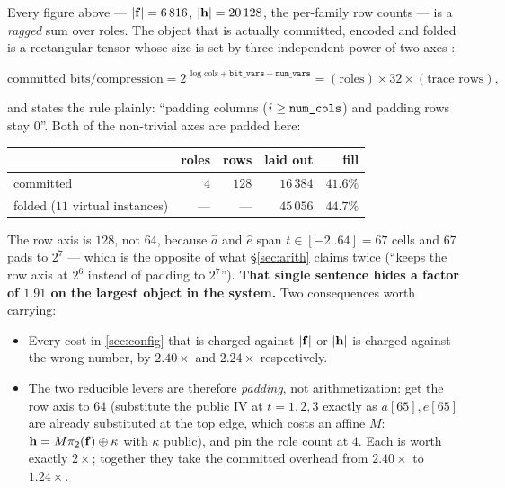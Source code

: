 \begin{warning}\label{warn:laidout}
Every figure above --- $|\mathbf{f}|=6\,816$, $|\mathbf{h}|=20\,128$, the per-family row
counts --- is a \emph{ragged} sum over roles. The object that is actually
committed, encoded and folded is a rectangular tensor whose size is set by three
independent power-of-two axes :
\begin{center}
\small
\(
  \text{committed bits/compression}
  =
  2^{\,\log\mathrm{cols}+\mathtt{bit\_vars}+\mathtt{num\_vars}}
  =
  (\text{roles})\times32\times(\text{trace rows}),
\)
\end{center}
and  states the rule plainly: ``padding columns
($i\geq\code{num\_cols}$) and padding rows stay $0$''. Both of the non-trivial
axes are padded here:

\begin{center}\small
\begin{tabular}{@{}lrrrr@{}}
\toprule
& roles & rows & laid out & fill\\
\midrule
committed & $4$ & $128$ & $16\,384$ & $\mathbf{41.6\%}$\\
folded ($11$ virtual instances) & --- & --- & $45\,056$ & $\mathbf{44.7\%}$\\
\bottomrule
\end{tabular}
\end{center}

\noindent
The row axis is $128$, not $64$, because $\hat a$ and $\hat e$ span
$t\in[-2..64]=67$ cells and $67$ pads to $2^7$ --- which is the opposite of what
\S\ref{sec:arith} claims twice (``keeps the row axis at $2^6$ instead of padding
to $2^7$''). \textbf{That single sentence hides a factor of $1.91$ on the
largest object in the system.} Two consequences worth carrying:
\begin{itemize}[leftmargin=1.4em,itemsep=2pt,topsep=4pt]
  \item Every cost in \cref{sec:config} that is charged against $|\mathbf{f}|$ or
        $|\mathbf{h}|$ is charged against the wrong number, by $2.40\times$ and
        $2.24\times$ respectively.
  \item The two reducible levers are therefore \emph{padding}, not
        arithmetization: get the row axis to $64$ (substitute the public IV at
        $t=1,2,3$ exactly as $a[65],e[65]$ are already substituted at the top
        edge, which costs an affine $M$: $\mathbf{h}=M\pi_2(\mathbf{f})\oplus\kappa$ with
        $\kappa$ public), and pin the role count at $4$. Each is worth exactly
        $2\times$; together they take the committed overhead from $2.40\times$
        to $1.24\times$.
\end{itemize}
\end{warning}

